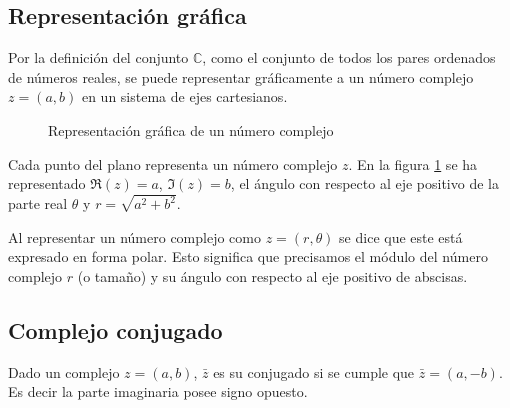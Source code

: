 \subsection{Representación gráfica}

Por la definición del conjunto $\mathbb{C}$, como el conjunto de todos los pares ordenados de números reales, se puede representar gráficamente a un número complejo $z=(a,b)$ en un sistema de ejes cartesianos.
\begin{figure}[ht]
  \centering
  \caption{Representación gráfica de un número complejo}
  \label{fig:grafica_de_un_complejo}
\end{figure}

Cada punto del plano representa un número complejo $z$. En la figura \ref{fig:grafica_de_un_complejo} se ha representado $\Re(z)=a$, $\Im(z)=b$, el ángulo con respecto al eje positivo de la parte real $\theta$ y $r=\sqrt{a^2+b^2}$. 

Al representar un número complejo como $z=(r,\theta)$ se dice que este está expresado en forma polar. Esto significa que precisamos el módulo del número complejo $r$ (o tamaño) y su ángulo con respecto al eje positivo de abscisas. 

\subsection{Complejo conjugado}

Dado un complejo $z=(a,b)$, $\bar{z}$ es su conjugado si se cumple que $\bar{z}=(a,-b)$. Es decir la parte imaginaria posee signo opuesto.

